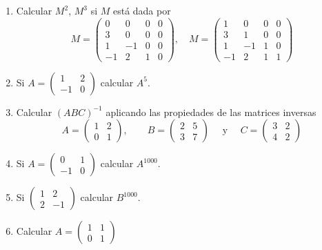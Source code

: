 \documentclass[
]{article}
\begin{document}
\begin{enumerate}
\def\labelenumi{\arabic{enumi}.}
\setcounter{enumi}{6}
\item
  Calcular \(M^2\), \(M^3\) si \(M\) está dada por \[
  M= \begin{pmatrix}
            0   & 0 & 0 & 0 \\
           3    & 0 & 0 & 0 \\
           1    & -1& 0 & 0 \\
           -1   & 2& 1 & 0   
   \end{pmatrix}, \quad
  M= \begin{pmatrix}
            1   & 0 & 0 & 0 \\
           3    & 1 & 0 & 0 \\
           1    & -1& 1 & 0 \\
           -1   & 2& 1 & 1   
   \end{pmatrix}
  \]
\item
  Si \(A=\begin{pmatrix} 1 & 2 \\ -1 & 0 \end{pmatrix}\) calcular
  \(A^5\).
\item
  Calcular \((ABC)^{-1}\) aplicando las propiedades de las matrices
  inversas \[
  A= \begin{pmatrix} 1 & 2 \\ 0 & 1 \end{pmatrix},\quad\quad B= \begin{pmatrix} 2 & 5 \\ 3 & 7 \end{pmatrix}\quad \mbox{ y } \quad 
  C= \begin{pmatrix} 3 & 2 \\ 4 & 2\end{pmatrix}
  \]
\item
  Si \(A=\begin{pmatrix} 0 & 1 \\ -1 & 0 \end{pmatrix}\) calcular
  \(A^{1000}\).
\item
  Si \(\begin{pmatrix} 1 & 2 \\ 2 & -1 \end{pmatrix}\) calcular
  \(B^{1000}\).
\item
  Calcular \(A=\begin{pmatrix} 1 & 1 \\ 0 & 1 \end{pmatrix}\)
\end{enumerate}
\end{document}
